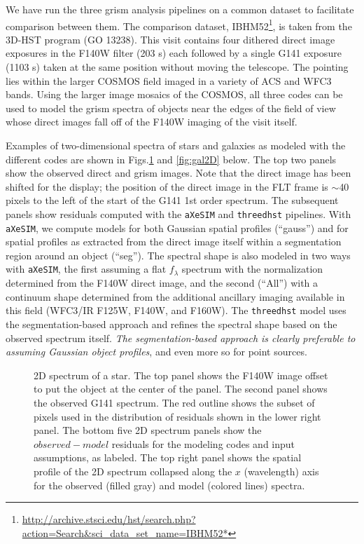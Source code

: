 \documentclass[preprint]{aastex}
\begin{document}
We have run the three grism analysis pipelines on a common dataset to facilitate comparison between them.  The comparison dataset, IBHM52\footnote{\url{http://archive.stsci.edu/hst/search.php?action=Search&sci_data_set_name=IBHM52*}}, is taken from the 3D-HST program (GO 13238).  This visit contains four dithered direct image exposures in the F140W filter (203 s) each followed by a single G141 exposure (1103 s) taken at the same position without moving the telescope.  The pointing lies within the larger COSMOS field imaged in a variety of ACS and WFC3 bands.  Using the larger image mosaics of the COSMOS, all three codes can be used to model the grism spectra of objects near the edges of the field of view whose direct images fall off of the F140W imaging of the visit itself.
    
    Examples of two-dimensional spectra of stars and galaxies as modeled with the different codes are shown in Figs.\ref{fig:star2D} and \ref{fig:gal2D} below.  The top two panels show the observed direct and grism images.  Note that the direct image has been shifted for the display; the position of the direct image in the FLT frame is $\sim$40 pixels to the left of the start of the G141 1st order spectrum.  The subsequent panels show residuals computed with the \texttt{aXeSIM} and \texttt{threedhst} pipelines.  With \texttt{aXeSIM}, we compute models for both Gaussian spatial profiles (``gauss'') and for spatial profiles as extracted from the direct image itself within a segmentation region around an object (``seg'').  The spectral shape is also modeled in two ways with \texttt{aXeSIM}, the first assuming a flat $f_\lambda$ spectrum with the normalization determined from the F140W direct image, and the second (``All'') with a continuum shape determined from the additional ancillary imaging available in this field (WFC3/IR F125W, F140W, and F160W).  The \texttt{threedhst} model uses the segmentation-based approach and refines the spectral shape based on the observed spectrum itself.  \textit{The segmentation-based approach is clearly preferable to assuming Gaussian object profiles}, and even more so for point sources.  
    
    
    
\begin{figure}
    \caption{2D spectrum of a star.  The top panel shows the F140W image offset to put the object at the center of the panel.  The second panel shows the observed G141 spectrum.  The red outline shows the subset of pixels used in the distribution of residuals shown in the lower right panel.  The bottom five 2D spectrum panels show the $observed-model$ residuals for the modeling codes and input assumptions, as labeled.  The top right panel shows the spatial profile of the 2D spectrum collapsed along the $x$ (wavelength) axis for the observed (filled gray) and model (colored lines) spectra.}
    \label{fig:star2D}
\end{figure}
\end{document}
